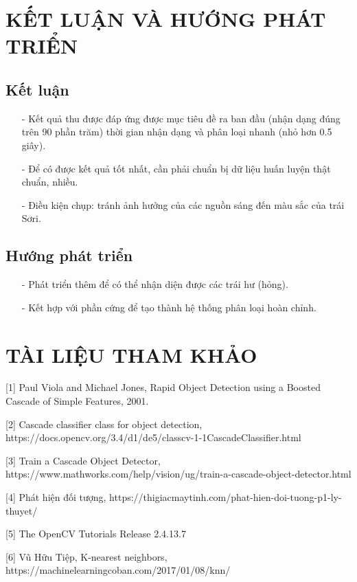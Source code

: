 \documentclass[12pt,a4paper]{article}
\begin{document}
\section{KẾT LUẬN VÀ HƯỚNG PHÁT TRIỂN}
\subsection{Kết luận}
\begin{itemize}
\item[-] Kết quả thu được đáp ứng được mục tiêu đề ra ban đầu (nhận dạng đúng trên 90 phần trăm) thời gian nhận dạng và phân loại nhanh (nhỏ hơn 0.5 giây).
\item[-] Để có được kết quả tốt nhất, cần phải chuẩn bị dữ liệu huấn luyện thật chuẩn, nhiều.
\item[-] Điều kiện chụp: tránh ảnh hưởng của các nguồn sáng đến màu sắc của trái Sơri.
\end{itemize}
\subsection{Hướng phát triển}
\begin{itemize}
\item[-] Phát triển thêm để có thể nhận diện được các trái hư (hỏng).
\item[-] Kết hợp với phần cứng để tạo thành hệ thống phân loại hoàn chỉnh.  
\end{itemize}
\pagebreak
\section{TÀI LIỆU THAM KHẢO}
[1] Paul Viola and Michael Jones, Rapid Object Detection using a Boosted Cascade of Simple Features, 2001.

[2] Cascade classifier class for object detection, https://docs.opencv.org/3.4/d1/de5/classcv-1-1CascadeClassifier.html

[3] Train a Cascade Object Detector, https://www.mathworks.com/help/vision/ug/train-a-cascade-object-detector.html

[4] Phát hiện đối tượng, https://thigiacmaytinh.com/phat-hien-doi-tuong-p1-ly-thuyet/ 

[5] The OpenCV Tutorials Release 2.4.13.7

[6] Vũ Hữu Tiệp, K-nearest neighbors, https://machinelearningcoban.com/2017/01/08/knn/
\pagebreak
\end{document}
